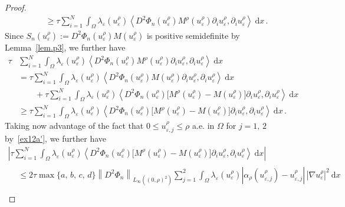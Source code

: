 \documentclass[10pt]{amsart}
\theoremstyle{definition}\newtheorem{defi}[theo]{Definition}\newtheorem{rema}[theo]{Remark}\newtheorem{exam}[theo]{Example}\newtheorem{exem}[theo]{Example}\newtheorem{nota}[theo]{Notation}
\newcommand{\rmd}{\mathrm{d}}
\begin{document}
\begin{proof}
\begin{equation}
\begin{split}
&\geq \tau \sum_{i=1}^N\int_\Omega\lambda_\varepsilon(u_\varepsilon^\rho) \left\langle D^2\Phi_n(u_\varepsilon^\rho) M^\rho(u_\varepsilon^\rho) \partial_i u_{\varepsilon}^\rho, \partial _i u_\varepsilon^\rho\right\rangle\ \rmd x\,. 
\end{split}
\end{equation}
\endgroup
Since $S_n(u_\varepsilon^\rho) := D^2\Phi_n(u_\varepsilon^\rho) M(u_\varepsilon^\rho)$ is positive semidefinite by Lemma~\ref{lem.p3}, we further have
\begin{equation}\label{pro4}
\begin{split}
\tau &\sum_{i=1}^N\int_\Omega \lambda_\varepsilon(u_\varepsilon^\rho) \left\langle D^2\Phi_n(u_\varepsilon^\rho) M^\rho(u_\varepsilon^\rho) \partial_i u_{\varepsilon}^\rho, \partial _iu_\varepsilon^\rho\right\rangle\ \rmd x\\[1ex]
& = \tau \sum_{i=1}^N\int_\Omega \lambda_\varepsilon(u_\varepsilon^\rho) \left\langle D^2\Phi_n(u_\varepsilon^\rho) M(u_\varepsilon^\rho) \partial_i u_{\varepsilon}^\rho, \partial _iu_\varepsilon^\rho\right\rangle\ \rmd x \\[1ex]
&\qquad + \tau \sum_{i=1}^N\int_\Omega \lambda_\varepsilon(u_\varepsilon^\rho) \left\langle D^2\Phi_n(u_\varepsilon^\rho)\big[M^\rho(u_\varepsilon^\rho) - M(u_\varepsilon^\rho)\big] \partial_i u_{\varepsilon}^\rho, \partial _i u_\varepsilon^\rho\right\rangle\ \rmd x\\[1ex]
&\geq \tau \sum_{i=1}^N\int_\Omega \lambda_\varepsilon(u_\varepsilon^\rho) \left\langle D^2\Phi_n(u_\varepsilon^\rho) \big[M^\rho(u_\varepsilon^\rho) - M(u_\varepsilon^\rho)\big] \partial_i u_{\varepsilon}^\rho, \partial _i u_\varepsilon^\rho\right\rangle\ \rmd x\,. 
\end{split}
\end{equation}
Taking now advantage of the fact that $0 \le u_{\varepsilon,j}^\rho\leq \rho$ a.e. in $\Omega$ for $j=1,\, 2$ by~\eqref{ex12a'}, we further have
\begin{multline*}
\left| \tau \sum_{i=1}^N\int_\Omega \lambda_\varepsilon(u_\varepsilon^\rho) \left\langle D^2\Phi_n(u_\varepsilon^\rho) \big[M^\rho(u_\varepsilon^\rho) - M(u_\varepsilon^\rho)\big] \partial_i u_{\varepsilon}^\rho, \partial _i u_\varepsilon^\rho\right\rangle\ \rmd x\right|\\[1ex]
\begin{aligned}
& \le 2\tau \max\{a,\,b,\,c,\,d\} \left\|D^2\Phi_n\right\|_{L_\infty\left((0,\rho)^2\right)} \sum_{j=1}^2 \int_\Omega \lambda_\varepsilon(u_\varepsilon^\rho) \left|\alpha_\rho\left(u_{\varepsilon,j}^\rho\right) - u_{\varepsilon,j}^\rho\right|\, \left|\nabla u_\varepsilon^\rho\right|^2 \ \rmd x\\[1ex]

\end{aligned}
\end{multline*}
\end{proof}
\end{document}
